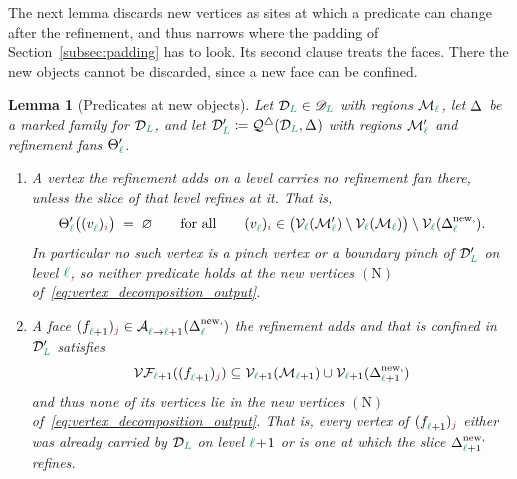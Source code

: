 \documentclass[a4paper, 12pt]{article}
\makeatletter
\newcommand{\quadriF}{\mathcal{Q}^{\triangle}}                   %
\newcommand{\green}{\color{ForestGreen}}
\newcommand{\brickred}{\color{BrickRed}}
\newcommand{\V}{\mathcal{V}}
\newcommand{\F}{\mathcal{F}}
\DeclareRobustCommand{\simplexsubsetTwo}[2][]{\Delta\ifx\@empty#1\@empty\else^{#1}\fi_{#2}}
\DeclareRobustCommand{\simplexsubsetNew}[2][]{\Delta^{\mathrm{new}\ifx\@empty#1\@empty\else,#1\fi}_{#2}}
\newcommand{\vertex}[2]{\freeQ{v}{}{#1}{#2}}
\newcommand{\face}[2]{\freeQ{f}{}{#1}{#2}}
\newcommand{\VFl}[1]{\V\F_{#1}}
\newcommand{\coarseIdxone}{{\brickred i}}
\newcommand{\fineIdxone}{{\brickred j}}
\renewcommand{\l}{{\green\ell}}
\renewcommand{\L}{{\green L}}
\newcommand{\freeQ}[4]{ ( {#1}^{#2}_{#3} )_{#4}}
\newcommand{\Aop}[3]{\mathcal{A}^{#1}_{{#2} \to {#3}}}
\newcommand{\M}{\mathcal{M}}
\newtheorem{lemma}[theorem]{Lemma}
\theoremstyle{definition}
\theoremstyle{plain}
\numberwithin{equation}{section}
\DeclareRobustCommand{\domseq}[1][]{\mathcal{D}\ifx\@empty#1\@empty\else_{#1}\fi}
\newcommand{\alldomseqs}{\mathscr{D}}
\newcommand{\refFan}[1]{\Theta_{#1}}                        %
\makeatother
\begin{document}
\smallskip

The next lemma discards new vertices as sites at which a predicate can change after the refinement, and thus narrows where the padding of Section~\ref{subsec:padding} has to look. Its second clause treats the faces. There the new objects cannot be discarded, since a new face can be confined.

\begin{lemma}[Predicates at new objects]
    \label{lemma:new_objects}
    Let $\domseq[\L] \in \alldomseqs_\L$ with regions $\M_\l$, let $\simplexsubsetTwo{}$ be a marked family for $\domseq[\L]$, and let $\domseq[\L]' \coloneq \quadriF(\domseq[\L], \simplexsubsetTwo{})$ with regions $\M'_\l$ and refinement fans $\refFan{\l}'$.
    \begin{enumerate}[topsep=3pt, itemsep=-2pt]
        \item[$(i)$] A vertex the refinement adds on a level carries no refinement fan there, unless the slice of that level refines at it. That is,
        \begin{equation}
            \label{eq:new_vertex_empty_fan}
            \refFan{\l}' \big( \vertex{\l}{\coarseIdxone} \big) \; = \; \varnothing \qquad \text{for all} \qquad \vertex{\l}{\coarseIdxone} \in \big( \V_\l(\M'_\l) \setminus \V_\l(\M_\l) \big) \setminus \V_\l ( \simplexsubsetNew{\l} ) .
        \end{equation}
        In particular no such vertex is a pinch vertex or a boundary pinch of $\domseq[\L]'$ on level $\l$, so neither predicate holds at the new vertices $(\mathrm{N})$ of~\eqref{eq:vertex_decomposition_output}.
        \item[$(ii)$] A face $\face{\l+1}{\fineIdxone} \in \Aop{}{\l}{\l+1}(\simplexsubsetNew{\l})$ the refinement adds and that is confined in $\domseq[\L]'$ satisfies 
        \begin{equation}
            \label{eq:confined_new_face_no_part_C}
            \VFl{\l+1}(\face{\l+1}{\fineIdxone}) \subseteq \V_{\l+1}(\M_{\l+1}) \cup \V_{\l+1} ( \simplexsubsetNew{\l+1} )
        \end{equation}
        and thus none of its vertices lie in the new vertices $(\mathrm{N})$ of~\eqref{eq:vertex_decomposition_output}. That is, every vertex of $\face{\l+1}{\fineIdxone}$ either was already carried by $\domseq[\L]$ on level $\l\!+\!1$ or is one at which the slice $\simplexsubsetNew{\l+1}$ refines.
    \end{enumerate}
\end{lemma}
\end{document}
